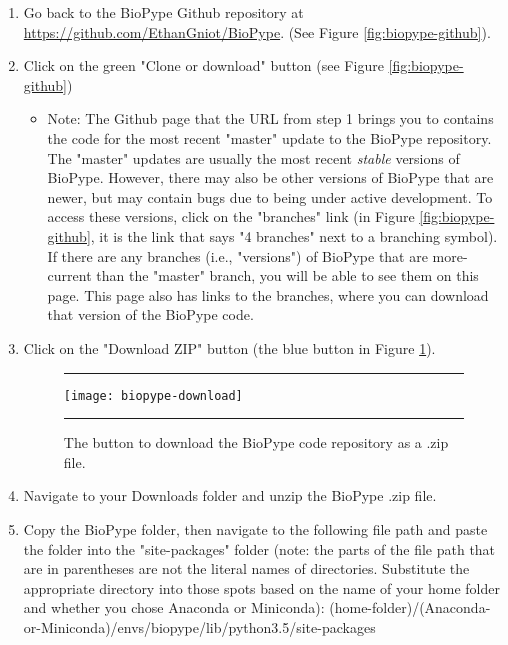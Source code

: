 \begin{enumerate}
\item Go back to the BioPype Github repository at \url{https://github.com/EthanGniot/BioPype}. (See Figure \ref{fig:biopype-github}).

\item Click on the green "Clone or download" button (see Figure \ref{fig:biopype-github})
    \begin{itemize}
    \item \small Note: The Github page that the URL from step 1 brings you to contains the code for the most recent "master" update to the BioPype repository. The "master" updates are usually the most recent \textit{stable} versions of BioPype. However, there may also be other versions of BioPype that are newer, but may contain bugs due to being under active development. To access these versions, click on the "branches" link (in Figure \ref{fig:biopype-github}, it is the link that says "4 branches" next to a branching symbol). If there are any branches (i.e., "versions") of BioPype that are more-current than the "master" branch, you will be able to see them on this page. This page also has links to the branches, where you can download that version of the BioPype code.
    \end{itemize}
%
\item Click on the "Download ZIP" button (the blue button in Figure \ref{fig:biopype-download}).
    \begin{figure}[hbtp]
        \begin{maxipage}
        \hrule
        \centering
        \texttt{[image: biopype-download]}
        \caption{The button to download the BioPype code repository as a .zip file.}
        \label{fig:biopype-download}
        \hrule
        \end{maxipage}
    \end{figure}
    

\item Navigate to your Downloads folder and unzip the BioPype .zip file. 


\item Copy the BioPype folder, then navigate to the following file path and paste the folder into the "site-packages" folder (note: the parts of the file path that are in parentheses are not the literal names of directories. Substitute the appropriate directory into those spots based on the name of your home folder and whether you chose Anaconda or Miniconda):\newline
(home-folder)/(Anaconda-or-Miniconda)/envs/biopype/lib/python3.5/site-packages

\end{enumerate}


